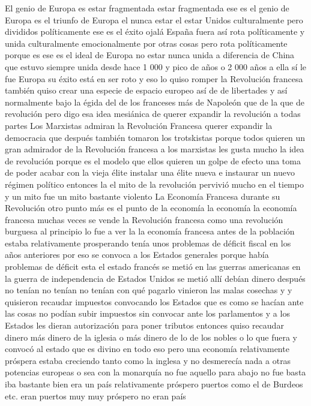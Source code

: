 El genio de Europa es estar fragmentada
estar fragmentada ese es el genio de Europa es el triunfo de Europa el nunca estar el estar Unidos culturalmente
pero divididos políticamente ese es el éxito ojalá España fuera así rota políticamente y unida culturalmente
emocionalmente por otras cosas pero rota políticamente porque es ese es el ideal de Europa
no estar nunca unida a diferencia de China que estuvo siempre unida desde hace 1 000 y pico de años o 2 000 años a ella sí le fue
Europa su éxito está en ser roto y eso lo quiso romper la Revolución francesa también quiso crear una especie de espacio europeo
así de de libertades y así normalmente bajo la égida del de los franceses
más de Napoleón que de la que de revolución pero digo esa idea mesiánica de querer expandir la revolución a todas partes
Los Marxistas admiran la Revolución Francesa
querer expandir la democracia que después también tomaron los trotskistas porque todos quieren un gran admirador de la Revolución francesa a los marxistas les gusta mucho la idea de revolución
porque es el modelo que ellos quieren un golpe de efecto una toma de poder acabar con la vieja élite instalar una élite nueva
e instaurar un nuevo régimen político entonces la el mito de la revolución pervivió mucho en el tiempo y un mito fue un mito bastante violento
La Economía Francesa durante su Revolución
otro punto más es el punto de la economía la economía la economía francesa
muchas veces se vende la Revolución francesa como una revolución burguesa al principio lo fue a ver la la economía francesa antes de la población
estaba relativamente prosperando tenía unos problemas de déficit fiscal en los años anteriores por eso se convoca a los Estados generales
porque había problemas de déficit esta el estado francés se metió en las guerras americanas en la guerra de independencia de Estados Unidos
se metió allí debían dinero después no tenían no tenían no tenían con qué pagarlo vinieron las malas cosechas y
y quisieron recaudar impuestos convocando los Estados que es como se hacían ante las cosas no podían subir impuestos
sin convocar ante los parlamentos y a los Estados les dieran autorización para poner tributos
entonces quiso recaudar dinero más dinero de la iglesia o más dinero de lo de los nobles o lo que fuera y convocó al estado que es divino en todo eso
pero una economía relativamente próspera estaba creciendo tanto como la inglesa y no desmerecía nada a otras potencias europeas
o sea con la monarquía no fue aquello para abajo no fue basta iba bastante bien
era un país relativamente próspero puertos como el de Burdeos etc. eran puertos muy muy próspero no eran país

